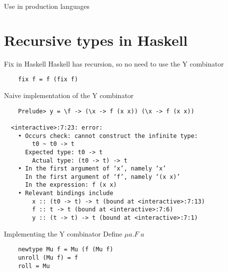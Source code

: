 \documentclass[10pt]{beamer}
\newcommand{\app}[2]{#1 \; #2}
\begin{document}
\begin{frame}[fragile]{Use in production languages}
  \begin{itemize}
  \end{itemize}
\end{frame}

\section{Recursive types in Haskell}

\begin{frame}[fragile]{Fix in Haskell}
  Haskell has recursion, so no need to use the Y combinator
  \begin{verbatim}
    fix f = f (fix f)
  \end{verbatim}
\end{frame}

\begin{frame}[fragile]{Naive implementation of the Y combinator}
  \begin{verbatim}
    Prelude> y = \f -> (\x -> f (x x)) (\x -> f (x x))

  <interactive>:7:23: error:
    • Occurs check: cannot construct the infinite type:
        t0 ~ t0 -> t
      Expected type: t0 -> t
        Actual type: (t0 -> t) -> t
    • In the first argument of ‘x’, namely ‘x’
      In the first argument of ‘f’, namely ‘(x x)’
      In the expression: f (x x)
    • Relevant bindings include
        x :: (t0 -> t) -> t (bound at <interactive>:7:13)
        f :: t -> t (bound at <interactive>:7:6)
        y :: (t -> t) -> t (bound at <interactive>:7:1)
  \end{verbatim}
\end{frame}

\begin{frame}[fragile]{Implementing the Y combinator}
Define $\mu a . \app{F}{a}$
  \begin{verbatim}
    newtype Mu f = Mu (f (Mu f)
    unroll (Mu f) = f
    roll = Mu
  \end{verbatim}
\end{frame}
\end{document}
